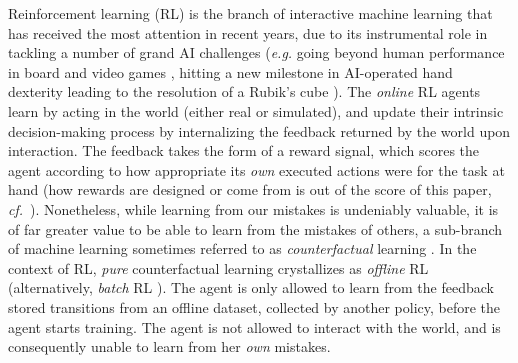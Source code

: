 Reinforcement learning (RL) \cite{Sutton1998-ow}
is the branch of interactive machine learning
that has received the most attention in recent years, due to
its instrumental role in tackling a number of grand AI challenges
(\textit{e.g.} going beyond human performance in
board and video games \cite{Mnih2013-rb, Mnih2015-iy, Silver2017-xo, Silver2016-my, Vinyals2019-vx, OpenAI2019-xy},
hitting a new milestone in AI-operated hand dexterity leading
to the resolution of a Rubik's cube \cite{OpenAI2019-vy}).
The \emph{online} RL agents learn by acting in the world (either real or simulated),
and update their intrinsic decision-making process by
internalizing the feedback returned by the world upon interaction.
The feedback takes the form of a reward signal,
which scores the agent according to how appropriate its \emph{own} executed actions were for the task at hand
(how rewards are designed or come from is out of the score of this paper,
\textit{cf.}~\cite{Singh2009-cm}).
Nonetheless, while learning from our mistakes is undeniably valuable, it is of far greater
value to be able to learn from the mistakes of others,
a sub-branch of machine learning sometimes referred to as \emph{counterfactual} learning
\cite{Bottou2013-so}.
In the context of RL, \emph{pure}
counterfactual learning crystallizes as \emph{offline} RL \cite{Levine2020-hz}
(alternatively, \emph{batch} RL \cite{Lange2012-cc}).
The agent is only allowed to learn from the feedback stored transitions
from an offline dataset, collected by another policy, before the agent starts training.
The agent is not allowed to interact with the world, and is consequently unable to learn from her \emph{own} mistakes.


